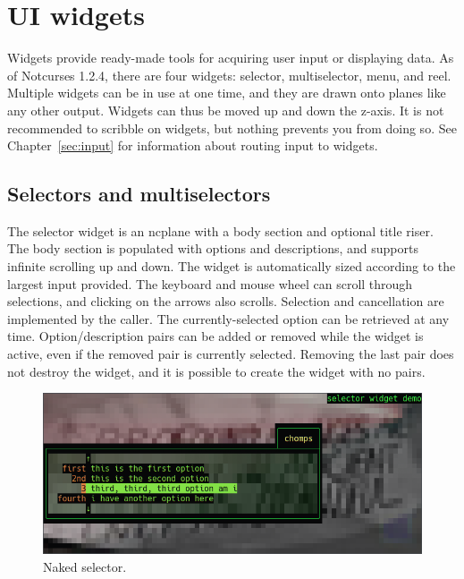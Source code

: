 \documentclass[letterpaper,10pt]{article}
\begin{document}
\cleardoublepage


\cleardoublepage

\section{UI widgets}
Widgets provide ready-made tools for acquiring user input or displaying data.
As of Notcurses 1.2.4, there are four widgets: selector, multiselector, menu,
and reel. Multiple widgets can be in use at one time, and they are drawn onto
planes like any other output. Widgets can thus be moved up and down the z-axis.
It is not recommended to scribble on widgets, but nothing prevents you from
doing so. See Chapter~\ref{sec:input} for information about routing input to
widgets.

\label{sec:uiwidgets}
\subsection{Selectors and multiselectors}

The selector widget is an ncplane with a body section and optional title riser.
The body section is populated with options and descriptions, and supports
infinite scrolling up and down. The widget is automatically sized according to
the largest input provided. The keyboard and mouse wheel can scroll through
selections, and clicking on the arrows also scrolls. Selection and cancellation
are implemented by the caller. The currently-selected option can be retrieved
at any time. Option/description pairs can be added or removed while the
widget is active, even if the removed pair is currently selected. Removing the
last pair does not destroy the widget, and it is possible to create the widget
with no pairs.

\begin{figure}[!htb]
  \centering \includegraphics[width=.75\linewidth]{media/selector5.png}
  \caption{Naked selector.}
\end{figure}
\end{document}

